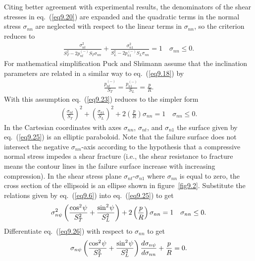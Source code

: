 \documentclass{AeroStructure-ERJohnson}
\begin{document}
Citing better agreement with experimental results, the denominators of the shear stresses in eq.~(\ref{eq9.20}) are expanded and the quadratic terms in the normal stress $\sigma_\textit{nn}$ are neglected with respect to the linear terms in $\sigma_\textit{nn}$, so the criterion reduces to
\begin{align}\label{eq9.23}
\frac{\sigma_{n t}^{2}}{S_{T}^{2}-2 p_{n t}^{(-)} S_{T} \sigma_{n n}}+\frac{\sigma_{n 1}^{2}}{S_{L}^{2}-2 p_{n 1}^{(-)} S_{L} \sigma_{n n}}=1 \quad \sigma_{n n} \leq 0.
\end{align}
For mathematical simplification Puck and Sh\"{u}mann assume that the inclination parameters are related in a similar way to eq.~(\ref{eq9.18}) by
\begin{align}\label{eq9.24}
\frac{p_{n t}^{(-)}}{S_{T}}=\frac{p_{n 1}^{(-)}}{S_{L}}=\frac{p}{R}.
\end{align}
With this assumption eq.~(\ref{eq9.23}) reduces to the simpler form
\begin{align}\label{eq9.25}
\left(\frac{\sigma_{n t}}{S_{T}}\right)^{2}+\left(\frac{\sigma_{n 1}}{S_{L}}\right)^{2}+2\left(\frac{p}{R}\right) \sigma_{n n}=1 \quad \sigma_{n n} \leq 0.
\end{align}
In the Cartesian coordinates with axes $\sigma_\textit{nn}$, $\sigma_\textit{nt}$, and $\sigma_{n1}$ the surface given by eq.~(\ref{eq9.25}) is an elliptic paraboloid. Note that the failure surface does not intersect the negative $\sigma_\textit{nn}$-axis according to the hypothesis that a compressive normal stress impedes a shear fracture (i.e., the shear resistance to fracture means the contour lines in the failure surface increase with increasing compression). In the shear stress plane $\sigma_\textit{nt}$-$\sigma_{n1}$ where $\sigma_\textit{nn}$ is equal to zero, the cross section of the ellipsoid is an ellipse shown in figure~\ref{fig9.2}. Substitute the relations given by eq.~(\ref{eq9.6}) into eq.~(\ref{eq9.25}) to get
\begin{align}\label{eq9.26}
\sigma_{n \psi}^{2}\left(\frac{\cos ^{2}{\kern-1pt\psi}}{S_{T}^{2}}+\frac{\sin ^{2}{\kern-1pt\psi}}{S_{L}^{2}}\right)+2\left(\frac{p}{R}\right) \sigma_{n n}=1 \quad \sigma_{n n} \leq 0.
\end{align}
Differentiate eq.~(\ref{eq9.26}) with respect to $\sigma_\textit{nn}$ to get
\begin{align}\label{eq9.27}
\sigma_{n \psi}\left(\frac{\cos ^{2}{\kern-1pt\psi}}{S_{T}^{2}}+\frac{\sin ^{2}{\kern-1pt\psi}}{S_{L}^{2}}\right) \frac{d \sigma_{n \psi}}{d \sigma_{n n}}+\frac{p}{R}=0.
\end{align}
\end{document}
